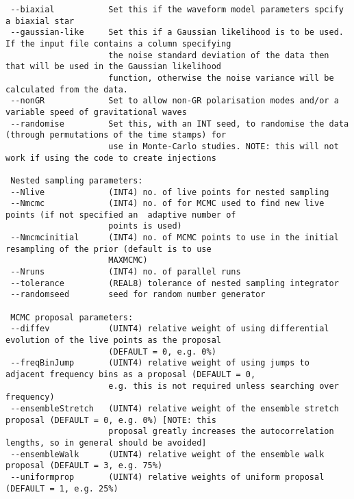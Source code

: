 \begin{footnotesize}
\begin{verbatim}
 --biaxial           Set this if the waveform model parameters spcify a biaxial star
 --gaussian-like     Set this if a Gaussian likelihood is to be used. If the input file contains a column specifying
                     the noise standard deviation of the data then that will be used in the Gaussian likelihood
                     function, otherwise the noise variance will be calculated from the data.
 --nonGR             Set to allow non-GR polarisation modes and/or a variable speed of gravitational waves
 --randomise         Set this, with an INT seed, to randomise the data (through permutations of the time stamps) for
                     use in Monte-Carlo studies. NOTE: this will not work if using the code to create injections

 Nested sampling parameters:
 --Nlive             (INT4) no. of live points for nested sampling
 --Nmcmc             (INT4) no. of for MCMC used to find new live points (if not specified an  adaptive number of
                     points is used)
 --Nmcmcinitial      (INT4) no. of MCMC points to use in the initial resampling of the prior (default is to use
                     MAXMCMC)
 --Nruns             (INT4) no. of parallel runs
 --tolerance         (REAL8) tolerance of nested sampling integrator
 --randomseed        seed for random number generator

 MCMC proposal parameters:
 --diffev            (UINT4) relative weight of using differential evolution of the live points as the proposal
                     (DEFAULT = 0, e.g. 0%)
 --freqBinJump       (UINT4) relative weight of using jumps to adjacent frequency bins as a proposal (DEFAULT = 0,
                     e.g. this is not required unless searching over frequency)
 --ensembleStretch   (UINT4) relative weight of the ensemble stretch proposal (DEFAULT = 0, e.g. 0%) [NOTE: this
                     proposal greatly increases the autocorrelation lengths, so in general should be avoided]
 --ensembleWalk      (UINT4) relative weight of the ensemble walk proposal (DEFAULT = 3, e.g. 75%)
 --uniformprop       (UINT4) relative weights of uniform proposal (DEFAULT = 1, e.g. 25%)


\end{verbatim}
\end{footnotesize}
